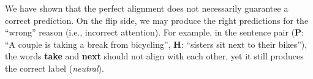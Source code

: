 

We have shown that the perfect alignment does not necessarily guarantee a correct prediction.
%
On the flip side, we may produce the right predictions for the ``wrong'' reason (i.e., incorrect attention). 
For example, in the sentence pair (\textbf{P}: ``A couple is taking a break from bicycling'', \textbf{H}: ``sisters sit next to their bikes''), the words \textbf{take} and \textbf{next} should not align with each other,
yet it still produces the correct label (\emph{neutral}).%







